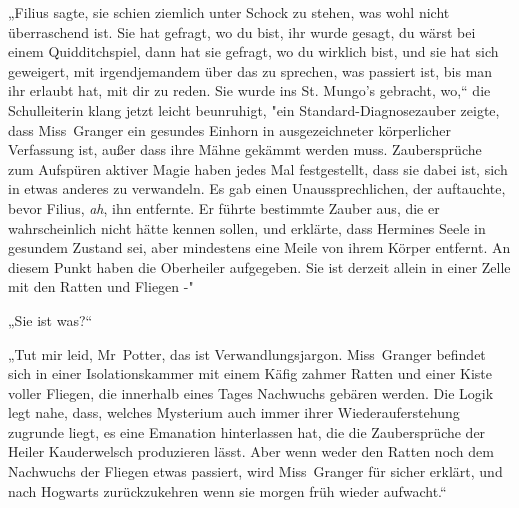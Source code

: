 „Filius sagte, sie schien ziemlich unter Schock zu stehen, was wohl nicht überraschend ist. Sie hat gefragt, wo du bist, ihr wurde gesagt, du wärst bei einem Quidditchspiel, dann hat sie gefragt, wo du wirklich bist, und sie hat sich geweigert, mit irgendjemandem über das zu sprechen, was passiert ist, bis man ihr erlaubt hat, mit dir zu reden. Sie wurde ins St. Mungo's gebracht, wo,“ die Schulleiterin klang jetzt leicht beunruhigt, "ein Standard-Diagnosezauber zeigte, dass Miss~Granger ein gesundes Einhorn in ausgezeichneter körperlicher Verfassung ist, außer dass ihre Mähne gekämmt werden muss. Zaubersprüche zum Aufspüren aktiver Magie haben jedes Mal festgestellt, dass sie dabei ist, sich in etwas anderes zu verwandeln.
Es gab einen Unaussprechlichen, der auftauchte, bevor Filius, \emph{ah}, ihn entfernte. Er führte bestimmte Zauber aus, die er wahrscheinlich nicht hätte kennen sollen, und erklärte, dass Hermines Seele in gesundem Zustand sei, aber mindestens eine Meile von ihrem Körper entfernt. An diesem Punkt haben die Oberheiler aufgegeben. Sie ist derzeit allein in einer Zelle mit den Ratten und Fliegen -"

„Sie ist was?“

„Tut mir leid, Mr~Potter, das ist Verwandlungsjargon. Miss~Granger befindet sich in einer Isolationskammer mit einem Käfig zahmer Ratten und einer Kiste voller Fliegen, die innerhalb eines Tages Nachwuchs gebären werden. Die Logik legt nahe, dass, welches Mysterium auch immer ihrer Wiederauferstehung zugrunde liegt, es eine Emanation hinterlassen hat, die die Zaubersprüche der Heiler Kauderwelsch produzieren lässt. Aber wenn weder den Ratten noch dem Nachwuchs der Fliegen etwas passiert, wird Miss~Granger für sicher erklärt, und nach Hogwarts zurückzukehren wenn sie morgen früh wieder aufwacht.“


